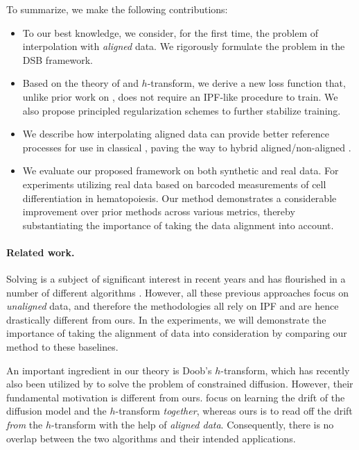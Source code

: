 To summarize, we make the following contributions:
\begin{itemize}[topsep=0pt]
\item To our best knowledge, we consider, for the first time, the problem of interpolation with \emph{aligned} data. We rigorously formulate the problem in the \acrshort{DSB} framework.

\item Based on the theory of  and $h$-transform, we derive a new loss function that, unlike prior work on , does not require an \acrshort{IPF}-like procedure to train. We also propose principled regularization schemes to further stabilize training.

\item We describe how interpolating aligned data can provide better reference processes for use in classical , paving the way to hybrid aligned/non-aligned .

\item {} We evaluate our proposed framework on both synthetic and real data. For experiments utilizing real data based on barcoded measurements of cell differentiation in hematopoiesis.
Our method demonstrates a considerable improvement over prior methods across various metrics, thereby substantiating the importance of taking the data alignment into account. 
\end{itemize}

\paragraph{Related work.}

Solving  is a subject of significant interest in recent years and has flourished in a number of different algorithms \citep{de2021diffusion,chen2021likelihood,vargas2021solving,bunne2022recovering,liu2022deep}. However, all these previous approaches focus on  \emph{unaligned} data, and therefore the methodologies all rely on \acrshort{IPF} and are hence drastically different from ours. In the experiments, we will demonstrate the importance of taking the alignment of data into consideration by comparing our method to these baselines.

An important ingredient in our theory is Doob's $h$-transform, which has recently also been utilized by \citet{liu2023learning} to solve the problem of constrained diffusion. However, their fundamental motivation is different from ours. \citet{liu2023learning} focus on learning the drift of the diffusion model and the $h$-transform \emph{together}, whereas ours is to read off the drift \emph{from} the $h$-transform with the help of {\em aligned data}. Consequently, there is no overlap between the two algorithms and their intended applications. 

